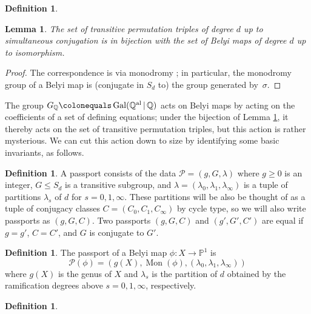 \documentclass{dcthesis}
\newcommand{\PP}{\mathbb P}
\newcommand{\QQ}{\mathbb Q}
\newcommand{\defi}[1]{\textsf{#1}}
\newcommand{\QQal}{{\mathbb Q}^{\textup{al}}}
\DeclareMathOperator{\Mon}{Mon}
\DeclareMathOperator{\Gal}{Gal}
\numberwithin{equation}{section}
\newtheorem{lemma}[equation]{Lemma}
\theoremstyle{definition}
\newtheorem{definition}[equation]{Definition}
\theoremstyle{remark}
\begin{document}
{{{\begin{definition}
    \end{definition}
    \begin{lemma}
      \label{lem:simulisom}
      The set of transitive permutation triples
      of degree $d$ up to simultaneous
      conjugation is in bijection with
      the set of Belyi maps of degree $d$ up to
      isomorphism.
    \end{lemma}
    \begin{proof}
      The correspondence is via monodromy
      \cite[Lemma 1.1]{KMSV}; in particular,
      the monodromy group of a Belyi map
      is (conjugate in $S_d$ to) the group
      generated by~$\sigma$.
    \end{proof}
    The group $G_\QQ\colonequals\Gal(\QQal\,|\,\QQ)$
    acts on Belyi maps by acting on the
    coefficients of a set of defining equations;
    under the bijection of Lemma
    \ref{lem:simulisom},
    it thereby acts on the set of
    transitive permutation
    triples, but this action is rather mysterious.
    We can cut this action down to size
    by identifying some basic invariants, as
    follows.
    \begin{definition}
      \label{def:passport}
      A \defi{passport} consists of the data
      $\mathcal{P}=(g,G,\lambda)$
      where $g \geq 0$ is an integer,
      $G \leq S_d$ is a transitive subgroup,
      and
      $\lambda=
      (\lambda_0,\lambda_1,\lambda_\infty)$
      is a tuple of partitions
      $\lambda_s$ of $d$ for $s=0,1,\infty$.
      These partitions will be also be
      thought of as a tuple of conjugacy classes
      $C=(C_0,C_1,C_\infty)$ by cycle
      type,
      so we will also write passports as $(g,G,C)$.
      Two passports $(g,G,C)$ and $(g',G',C')$
      are \defi{equal}
      if $g=g'$, $C=C'$, and
      $G$ is conjugate to $G'$.
    \end{definition}
    \begin{definition}
      \label{def:passportofbelyimap}
      The \defi{passport} of a
      Belyi map $\phi\colon X \to \PP^1$ is
      \begin{equation}
        \label{eqn:passportofbelyimap}
        \mathcal{P}(\phi)=
        (g(X),\Mon(\phi),
        (\lambda_0,\lambda_1,\lambda_\infty))
      \end{equation}
      where $g(X)$ is the genus of $X$ and
      $\lambda_s$ is the partition of $d$ obtained by the ramification degrees above
      $s=0,1,\infty$, respectively.
    \end{definition}
    \begin{definition}

\end{definition}}}}
\end{document}
